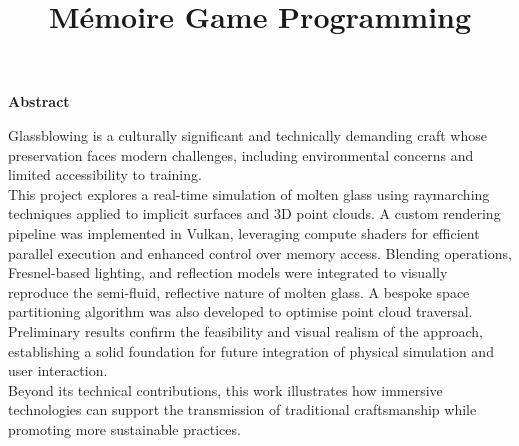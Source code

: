 \documentclass{rapportcs}
\title{Mémoire Game Programming}
\begin{document}




    




\fairemarges %
\fairepagedegarde %


\begin{center}
    \textbf{Abstract}
\end{center}

\vspace{1em} %

        Glassblowing is a culturally significant and technically demanding craft whose preservation faces modern challenges, including environmental concerns and limited accessibility to training. \\
        This project explores a real-time simulation of molten glass using raymarching techniques applied to implicit surfaces and 3D point clouds. A custom rendering pipeline was implemented in Vulkan, leveraging compute shaders for efficient parallel execution and enhanced control over memory access. Blending operations, Fresnel-based lighting, and reflection models were integrated to visually reproduce the semi-fluid, reflective nature of molten glass. A bespoke space partitioning algorithm was also developed to optimise point cloud traversal. \\
        Preliminary results confirm the feasibility and visual realism of the approach, establishing a solid foundation for future integration of physical simulation and user interaction. \\
        Beyond its technical contributions, this work illustrates how immersive technologies can support the transmission of traditional craftsmanship while promoting more sustainable practices.
    
\end{document}
